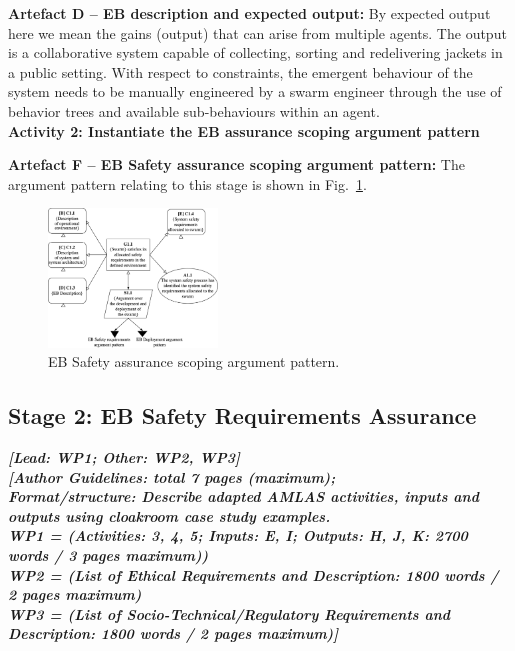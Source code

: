 \documentclass[lettersize,journal]{IEEEtran}
\begin{document}
\noindent \textbf{Artefact D -- EB description and expected output: }
By expected output here we mean the gains (output) that can arise from multiple agents.
The output is a collaborative system capable of collecting, sorting and redelivering jackets in a public setting. 
With respect to constraints, the emergent behaviour of the system needs to be manually engineered by a swarm engineer through the use of behavior trees and available sub-behaviours within an agent.\\
%

\noindent \textbf{Activity 2: Instantiate the EB assurance scoping argument pattern}

\noindent \textbf{Artefact F -- EB Safety assurance scoping argument pattern: }
The argument pattern relating to this stage is shown in Fig.~\ref{stage1-ap}. 
\begin{figure}
	\centering
	\includegraphics[width=0.4\textwidth]{figures/stage1-argumentpattern.png}
	\caption{EB Safety assurance scoping argument pattern.}
	\label{stage1-ap}
\end{figure}

\subsection{Stage 2: EB Safety Requirements Assurance} \label{framework-stage2}
\noindent \textbf{\textit{[Lead:  WP1; Other: WP2, WP3]}}\\ 
\noindent\textbf{\textit{[Author Guidelines: total 7 pages (maximum); \\Format/structure: Describe adapted AMLAS activities, inputs and outputs using cloakroom case study examples. \\
\noindent WP1 = (Activities: 3, 4, 5; Inputs: E, I; Outputs: H, J, K: 2700 words / 3 pages maximum))\\
\noindent WP2 = (List of Ethical Requirements and Description: 1800 words / 2 pages maximum)\\
\noindent WP3 = (List of Socio-Technical/Regulatory Requirements and Description: 1800 words / 2 pages maximum)]
}}\\
\end{document}
